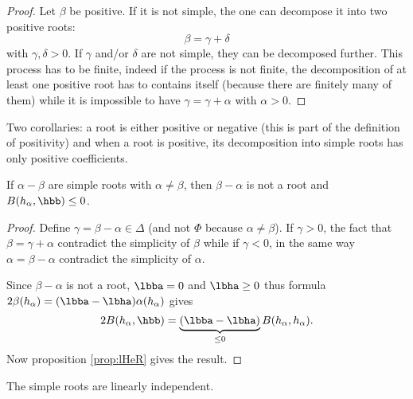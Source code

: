 \begin{proof}
    Let \( \beta\) be positive. If it is not simple, the one can decompose it into two positive roots:
    \begin{equation}
        \beta=\gamma+\delta
    \end{equation}
    with \( \gamma,\delta>0\). If \( \gamma\) and/or \( \delta\) are not simple, they can be decomposed further. This process has to be finite, indeed if the process is not finite, the decomposition of at least one positive root has to contains itself (because there are finitely many of them) while it is impossible to have \( \gamma=\gamma+\alpha\) with \( \alpha>0\).
\end{proof}

Two corollaries: a root is either positive or negative (this is part of the definition of positivity) and when a root is positive, its decomposition into simple roots has only positive coefficients.


\begin{lemma}
    If $\alpha-\beta$ are simple roots with $\alpha\neq\beta$, then $\beta-\alpha$ is not a root and $B( h_{\alpha},\hbb)\leq 0$.
\end{lemma}

\begin{proof}
    Define $\gamma=\beta-\alpha\in\Delta$ (and not $\Phi$ because $\alpha\neq\beta$). If $\gamma>0$, the fact that $\beta=\gamma+\alpha$ contradict the simplicity of $\beta$ while if $\gamma<0$, in the same way $\alpha=\beta-\alpha$ contradict the simplicity of $\alpha$.

    Since $\beta-\alpha$ is not a root, $\lbba=0$ and $\lbha\geq 0$ thus formula $2\beta( h_{\alpha})=(\lbba-\lbha)\alpha( h_{\alpha})$ gives
    \begin{equation}
        2B( h_{\alpha},\hbb)=\underbrace{(\lbba-\lbha)}_{\leq 0}B( h_{\alpha}, h_{\alpha}).
    \end{equation}
    Now proposition \ref{prop:lHeR} gives the result.
\end{proof}

\begin{lemma}
    The simple roots are linearly independent.
\end{lemma}

